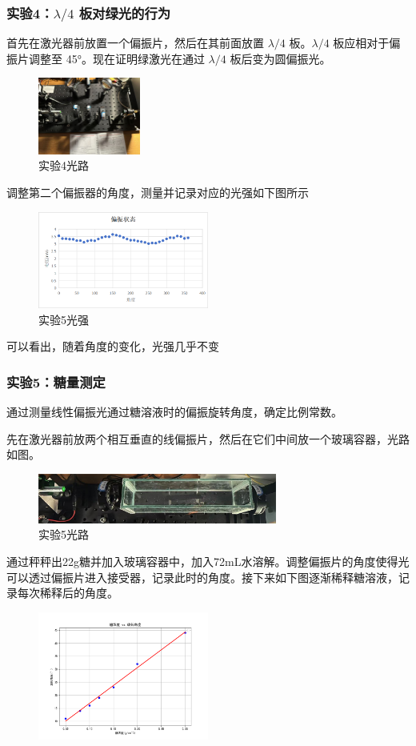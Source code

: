 \documentclass{ctexart}
\begin{document}
\subsubsection{实验4：$\lambda/4$ 板对绿光的行为}
首先在激光器前放置一个偏振片，然后在其前面放置 $\lambda/4$ 板。$\lambda/4$ 板应相对于偏振片调整至 45°。现在证明绿激光在通过 $\lambda/4$ 板后变为圆偏振光。
\begin{figure}[H]
    \centering
    \includegraphics[width=0.3\textwidth]{偏振光路.jpg}
    \caption{实验4光路}
\end{figure}
调整第二个偏振器的角度，测量并记录对应的光强如下图所示
\begin{figure}[H]
    \centering
    \includegraphics[width=0.5\textwidth]{实验5.png}
    \caption{实验5光强}
\end{figure}
可以看出，随着角度的变化，光强几乎不变

\subsubsection{实验5：糖量测定}
通过测量线性偏振光通过糖溶液时的偏振旋转角度，确定比例常数。

先在激光器前放两个相互垂直的线偏振片，然后在它们中间放一个玻璃容器，光路如图。
\begin{figure}[H]
    \centering
    \includegraphics[width=0.7\textwidth]{糖光路(1).jpg}
    \caption{实验5光路}
\end{figure}
通过秤秤出22g糖并加入玻璃容器中，加入72mL水溶解。调整偏振片的角度使得光可以透过偏振片进入接受器，记录此时的角度。接下来如下图逐渐稀释糖溶液，记录每次稀释后的角度。
\begin{figure}[H]
    \centering
    \includegraphics[width=0.5\textwidth]{糖浓度 vs 旋转角度.png}
\end{figure}
\end{document}
